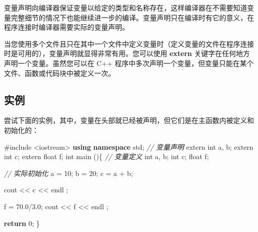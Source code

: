 \documentclass[
]{article}
\newenvironment{Shaded}{}{}
\newcommand{\AttributeTok}[1]{\textcolor[rgb]{0.49,0.56,0.16}{#1}}
\newcommand{\CommentTok}[1]{\textcolor[rgb]{0.38,0.63,0.69}{\textit{#1}}}
\newcommand{\ControlFlowTok}[1]{\textcolor[rgb]{0.00,0.44,0.13}{\textbf{#1}}}
\newcommand{\DataTypeTok}[1]{\textcolor[rgb]{0.56,0.13,0.00}{#1}}
\newcommand{\DecValTok}[1]{\textcolor[rgb]{0.25,0.63,0.44}{#1}}
\newcommand{\FloatTok}[1]{\textcolor[rgb]{0.25,0.63,0.44}{#1}}
\newcommand{\ImportTok}[1]{#1}
\newcommand{\KeywordTok}[1]{\textcolor[rgb]{0.00,0.44,0.13}{\textbf{#1}}}
\newcommand{\NormalTok}[1]{#1}
\newcommand{\OperatorTok}[1]{\textcolor[rgb]{0.40,0.40,0.40}{#1}}
\newcommand{\PreprocessorTok}[1]{\textcolor[rgb]{0.74,0.48,0.00}{#1}}
\begin{document}
变量声明向编译器保证变量以给定的类型和名称存在，这样编译器在不需要知道变量完整细节的情况下也能继续进一步的编译。变量声明只在编译时有它的意义，在程序连接时编译器需要实际的变量声明。

当您使用多个文件且只在其中一个文件中定义变量时（定义变量的文件在程序连接时是可用的），变量声明就显得非常有用。您可以使用
\textbf{extern} 关键字在任何地方声明一个变量。虽然您可以在 C++
程序中多次声明一个变量，但变量只能在某个文件、函数或代码块中被定义一次。

\hypertarget{ux5b9eux4f8b-1}{%
\subsection{实例}\label{ux5b9eux4f8b-1}}

尝试下面的实例，其中，变量在头部就已经被声明，但它们是在主函数内被定义和初始化的：

\begin{Shaded}
\begin{Highlighting}[]
\PreprocessorTok{\#include }\ImportTok{\textless{}iostream\textgreater{}}
\KeywordTok{using} \KeywordTok{namespace}\NormalTok{ std}\OperatorTok{;}
\CommentTok{// 变量声明}
\AttributeTok{extern} \DataTypeTok{int}\NormalTok{ a}\OperatorTok{,}\NormalTok{ b}\OperatorTok{;}
\AttributeTok{extern} \DataTypeTok{int}\NormalTok{ c}\OperatorTok{;}
\AttributeTok{extern} \DataTypeTok{float}\NormalTok{ f}\OperatorTok{;}
  \DataTypeTok{int}\NormalTok{ main }\OperatorTok{()\{}
  \CommentTok{// 变量定义}
  \DataTypeTok{int}\NormalTok{ a}\OperatorTok{,}\NormalTok{ b}\OperatorTok{;}
  \DataTypeTok{int}\NormalTok{ c}\OperatorTok{;}
  \DataTypeTok{float}\NormalTok{ f}\OperatorTok{;}
 
  \CommentTok{// 实际初始化}
\NormalTok{  a }\OperatorTok{=} \DecValTok{10}\OperatorTok{;}
\NormalTok{  b }\OperatorTok{=} \DecValTok{20}\OperatorTok{;}
\NormalTok{  c }\OperatorTok{=}\NormalTok{ a }\OperatorTok{+}\NormalTok{ b}\OperatorTok{;}
 
\NormalTok{  cout }\OperatorTok{\textless{}\textless{}}\NormalTok{ c }\OperatorTok{\textless{}\textless{}}\NormalTok{ endl }\OperatorTok{;}

\NormalTok{  f }\OperatorTok{=} \FloatTok{70.0}\OperatorTok{/}\FloatTok{3.0}\OperatorTok{;}
\NormalTok{  cout }\OperatorTok{\textless{}\textless{}}\NormalTok{ f }\OperatorTok{\textless{}\textless{}}\NormalTok{ endl }\OperatorTok{;}
 
  \ControlFlowTok{return} \DecValTok{0}\OperatorTok{;}
\OperatorTok{\}}
\end{Highlighting}
\end{Shaded}
\end{document}
